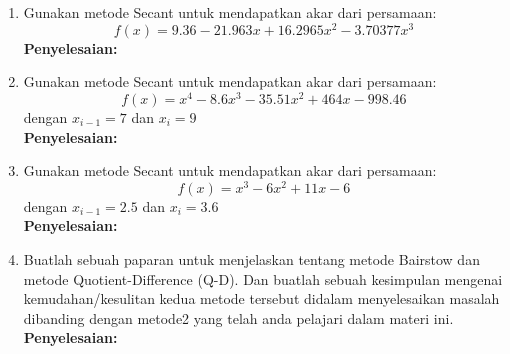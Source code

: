 \documentclass{article}
\newcommand{\penyelesaian}{\textbf{Penyelesaian: }}
\begin{document}
\begin{enumerate}
    \item Gunakan metode Secant untuk mendapatkan akar dari persamaan:
    \begin{equation*}
        f(x) = \num{9,36} - \num{21,963}x + \num{16,2965}x^2 - \num{3,70377}x^3
    \end{equation*}
    \penyelesaian

    \item Gunakan metode Secant untuk mendapatkan akar dari persamaan:
    \begin{equation*}
        f(x) = x^4 - \num{8,6}x^3 - \num{35,51}x^2 + \num{464}x - \num{998,46}
    \end{equation*}
    dengan $x_{i-1} = \num{7}$ dan $x_i = \num{9}$ \\
    \penyelesaian

    \item Gunakan metode Secant untuk mendapatkan akar dari persamaan:
    \begin{equation*}
        f(x) = x^3 - \num{6}x^2 + \num{11}x - \num{6}
    \end{equation*}
    dengan $x_{i-1} = \num{2,5}$ dan $x_i = \num{3,6}$ \\
    \penyelesaian

    \item Buatlah sebuah paparan untuk menjelaskan tentang metode Bairstow dan metode Quotient-Difference (Q-D). 
    Dan buatlah sebuah kesimpulan mengenai kemudahan/kesulitan kedua metode tersebut didalam menyelesaikan masalah dibanding dengan metode2 yang telah anda pelajari dalam materi ini. \\
    \penyelesaian

\end{enumerate}
\end{document}
